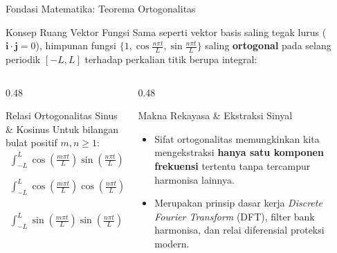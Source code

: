 \documentclass[aspectratio=169,10pt]{beamer}
\begin{document}
\begin{frame}{Fondasi Matematika: Teorema Ortogonalitas}
  \begin{block}{Konsep Ruang Vektor Fungsi}
    Sama seperti vektor basis saling tegak lurus ($\mathbf{i} \cdot \mathbf{j} = 0$), himpunan fungsi $\{1, \cos\frac{n\pi t}{L}, \sin\frac{n\pi t}{L}\}$ saling \textbf{ortogonal} pada selang periodik $[-L, L]$ terhadap perkalian titik berupa integral:
  \end{block}
  \begin{columns}[t]
    \begin{column}{0.48\textwidth}
      \begin{alertblock}{Relasi Ortogonalitas Sinus \& Kosinus}
        Untuk bilangan bulat positif $m, n \ge 1$:
        \begin{align*}
          \int_{-L}^{L} \cos\left(\frac{m\pi t}{L}\right) \sin\left(\frac{n\pi t}{L}\right) dt &= 0 \\
          \int_{-L}^{L} \cos\left(\frac{m\pi t}{L}\right) \cos\left(\frac{n\pi t}{L}\right) dt &= \begin{cases} 0, & m \ne n \\ L, & m = n \end{cases} \\
          \int_{-L}^{L} \sin\left(\frac{m\pi t}{L}\right) \sin\left(\frac{n\pi t}{L}\right) dt &= \begin{cases} 0, & m \ne n \\ L, & m = n \end{cases}
        \end{align*}
      \end{alertblock}
    \end{column}
    \begin{column}{0.48\textwidth}
      \begin{exampleblock}{Makna Rekayasa \& Ekstraksi Sinyal}
        \begin{itemize}
          \item Sifat ortogonalitas memungkinkan kita mengekstraksi \textbf{hanya satu komponen frekuensi} tertentu tanpa tercampur harmonisa lainnya.
          \item Merupakan prinsip dasar kerja \textit{Discrete Fourier Transform} (DFT), filter bank harmonisa, dan relai diferensial proteksi modern.
        \end{itemize}
      \end{exampleblock}
    \end{column}
  \end{columns}
\end{frame}
\end{document}
